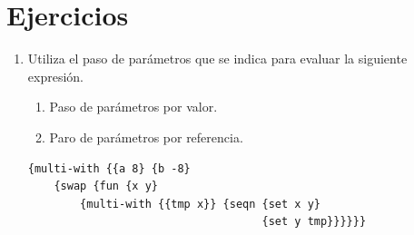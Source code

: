 \documentclass[11pt]{article}
\begin{document}
\section*{Ejercicios}

\begin{enumerate}[leftmargin=0.8cm]
    \item Utiliza el paso de parámetros que se indica para evaluar la siguiente expresión.\\
    \begin{enumerate}
        \item Paso de parámetros por valor.
        \item Paro de parámetros por referencia.\\
    \end{enumerate}
    \begin{lstlisting}
{multi-with {{a 8} {b -8}
    {swap {fun {x y}
        {multi-with {{tmp x}} {seqn {set x y} 
                                    {set y tmp}}}}}}
    

\end{lstlisting}
\end{enumerate}
\end{document}
